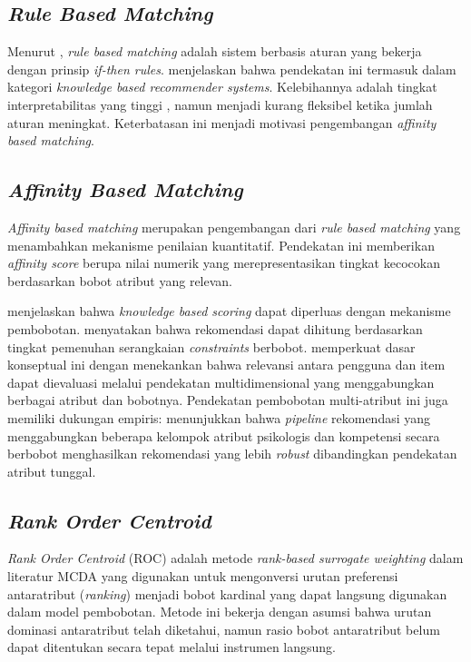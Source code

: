 \subsection{\emph{Rule Based Matching}}

Menurut \textcite{jackson1999}, \emph{rule based matching} adalah sistem berbasis aturan yang bekerja dengan prinsip \emph{if-then rules}. \textcite{burke2002} menjelaskan bahwa pendekatan ini termasuk dalam kategori \emph{knowledge based recommender systems}. Kelebihannya adalah tingkat interpretabilitas yang tinggi \autocite{russell2010}, namun menjadi kurang fleksibel ketika jumlah aturan meningkat. Keterbatasan ini menjadi motivasi pengembangan \emph{affinity based matching}.

\subsection{\emph{Affinity Based Matching}}

\emph{Affinity based matching} merupakan pengembangan dari \emph{rule based matching} yang menambahkan mekanisme penilaian kuantitatif. Pendekatan ini memberikan \emph{affinity score} berupa nilai numerik yang merepresentasikan tingkat kecocokan berdasarkan bobot atribut yang relevan.

\textcite{burke2002} menjelaskan bahwa \emph{knowledge based scoring} dapat diperluas dengan mekanisme pembobotan. \textcite{felfernig2014} menyatakan bahwa rekomendasi dapat dihitung berdasarkan tingkat pemenuhan serangkaian \emph{constraints} berbobot. \textcite{adomavicius2011} memperkuat dasar konseptual ini dengan menekankan bahwa relevansi antara pengguna dan item dapat dievaluasi melalui pendekatan multidimensional yang menggabungkan berbagai atribut dan bobotnya. Pendekatan pembobotan multi-atribut ini juga memiliki dukungan empiris: \textcite{sarsenbay2025} menunjukkan bahwa \emph{pipeline} rekomendasi yang menggabungkan beberapa kelompok atribut psikologis dan kompetensi secara berbobot menghasilkan rekomendasi yang lebih \emph{robust} dibandingkan pendekatan atribut tunggal.

\subsection{\emph{Rank Order Centroid}}

\emph{Rank Order Centroid} (ROC) adalah metode \emph{rank-based surrogate weighting} dalam literatur MCDA yang digunakan untuk mengonversi urutan preferensi antaratribut (\emph{ranking}) menjadi bobot kardinal yang dapat langsung digunakan dalam model pembobotan. Metode ini bekerja dengan asumsi bahwa urutan dominasi antaratribut telah diketahui, namun rasio bobot antaratribut belum dapat ditentukan secara tepat melalui instrumen langsung.

